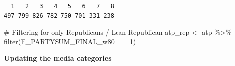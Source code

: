\documentclass[
  letterpaper,
  DIV=11,
  numbers=noendperiod]{scrartcl}
\newenvironment{Shaded}{\begin{snugshade}}{\end{snugshade}}
\newcommand{\CommentTok}[1]{\textcolor[rgb]{0.37,0.37,0.37}{#1}}
\newcommand{\DecValTok}[1]{\textcolor[rgb]{0.68,0.00,0.00}{#1}}
\newcommand{\FunctionTok}[1]{\textcolor[rgb]{0.28,0.35,0.67}{#1}}
\newcommand{\NormalTok}[1]{\textcolor[rgb]{0.00,0.23,0.31}{#1}}
\newcommand{\OtherTok}[1]{\textcolor[rgb]{0.00,0.23,0.31}{#1}}
\newcommand{\SpecialCharTok}[1]{\textcolor[rgb]{0.37,0.37,0.37}{#1}}
\begin{document}
\begin{verbatim}

  1   2   3   4   5   6   7   8 
497 799 826 782 750 701 331 238 
\end{verbatim}

\begin{Shaded}
\begin{Highlighting}[]
\CommentTok{\# Filtering for only Republicans / Lean Republican}
\NormalTok{atp\_rep }\OtherTok{\textless{}{-}}\NormalTok{ atp }\SpecialCharTok{\%\textgreater{}\%} \FunctionTok{filter}\NormalTok{(F\_PARTYSUM\_FINAL\_w80 }\SpecialCharTok{==} \DecValTok{1}\NormalTok{)}
\end{Highlighting}
\end{Shaded}

\textbf{Updating the media categories}
\end{document}

